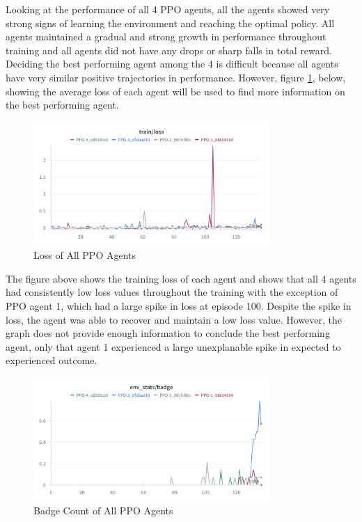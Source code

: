 Looking at the performance of all 4 PPO agents, all the agents showed very strong signs of learning the environment and reaching the optimal policy. All agents maintained a gradual and strong growth in performance throughout training and all agents did not have any drops or sharp falls in total reward. Deciding the best performing agent among the 4 is difficult because all agents have very similar positive trajectories in performance. However, figure \ref{fig:agent_eval_all_ppo_loss}, below, showing the average loss of each agent will be used to find more information on the best performing agent.

\begin{figure}[H]
    \centering
    \includegraphics[width=0.8\textwidth]{figures/PPO_loss.png}
    \caption{Loss of All PPO Agents}
    \label{fig:agent_eval_all_ppo_loss}
\end{figure}

The figure above shows the training loss of each agent and shows that all 4 agents had consistently low loss values throughout the training with the exception of PPO agent 1, which had a large spike in loss at episode 100. Despite the spike in loss, the agent was able to recover and maintain a low loss value. However, the graph does not provide enough information to conclude the best performing agent, only that agent 1 experienced a large unexplanable spike in expected to experienced outcome. 

\begin{figure}[H]
    \centering
    \includegraphics[width=0.8\textwidth]{figures/PPO_Badge.png}
    \caption{Badge Count of All PPO Agents}
    \label{fig:agent_eval_all_ppo_badge}
\end{figure}

